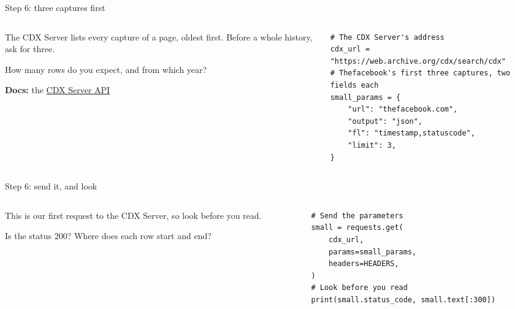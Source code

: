 \documentclass[9pt,aspectratio=169]{beamer}
\begin{document}
\begin{frame}[fragile]{Step 6: three captures first}
    \begin{columns}[T]
        \begin{column}{0.37\textwidth}
            The CDX Server lists every capture of a page, oldest first. Before a whole history, ask for three.

            \medskip
            How many rows do you expect, and from which year?

            \medskip
            {\scriptsize\textbf{Docs:} the \href{https://github.com/internetarchive/wayback/tree/master/wayback-cdx-server}{CDX Server API}\par}
        \end{column}
        \begin{column}{0.6\textwidth}
\begin{lstlisting}
# The CDX Server's address
cdx_url = "https://web.archive.org/cdx/search/cdx"
# Thefacebook's first three captures, two fields each
small_params = {
    "url": "thefacebook.com",
    "output": "json",
    "fl": "timestamp,statuscode",
    "limit": 3,
}
\end{lstlisting}
        \end{column}
    \end{columns}
\end{frame}

\begin{frame}[fragile]{Step 6: send it, and look}
    \begin{columns}[T]
        \begin{column}{0.37\textwidth}
            This is our first request to the CDX Server, so look before you read.

            \medskip
            Is the status 200? Where does each row start and end?
        \end{column}
        \begin{column}{0.6\textwidth}
\begin{lstlisting}
# Send the parameters
small = requests.get(
    cdx_url,
    params=small_params,
    headers=HEADERS,
)
# Look before you read
print(small.status_code, small.text[:300])
\end{lstlisting}
        \end{column}
    \end{columns}
\end{frame}
\end{document}
